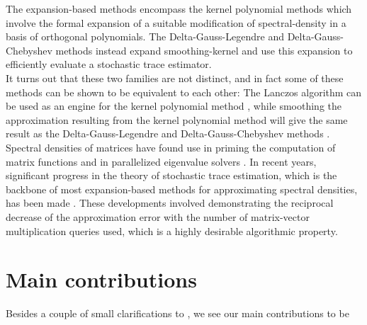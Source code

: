 The expansion-based methods encompass the kernel polynomial methods \cite{silver1994kpm, wang1994kpm, weisse2006kpm}
which involve the formal expansion of a suitable modification of \gls{spectral-density}
in a basis of orthogonal polynomials. The Delta-Gauss-Legendre \cite{lin2016review}
and Delta-Gauss-Chebyshev \cite{lin2017randomized} methods instead expand \gls{smoothing-kernel}
and use this expansion to efficiently evaluate a stochastic trace estimator.\\

It turns out that these two families are not distinct, and in fact some of these
methods can be shown to be equivalent to each other: The Lanczos algorithm
can be used as an engine for the kernel polynomial method \cite{chen2023kpm},
while smoothing the approximation resulting from the kernel polynomial method 
will give the same result as the Delta-Gauss-Legendre and Delta-Gauss-Chebyshev
methods \cite{lin2016review}.\\ 

Spectral densities of matrices have found use in priming the computation of matrix
functions \cite{fan2020spectrum} and in parallelized eigenvalue solvers
\cite{polizzi2009density, li2019slicing}. In recent years, significant progress
in the theory of stochastic trace estimation, which is the backbone of most
expansion-based methods for approximating spectral densities, has been made \cite{meyer2021hutch, persson2022hutch}.
These developments involved demonstrating the reciprocal decrease
of the approximation error with the number of matrix-vector multiplication
queries used, which is a highly desirable algorithmic property.


\section{Main contributions}
\label{sec:1-introduction-contributions}

Besides a couple of small clarifications to \cite{lin2017randomized}, we see our
main contributions to be

